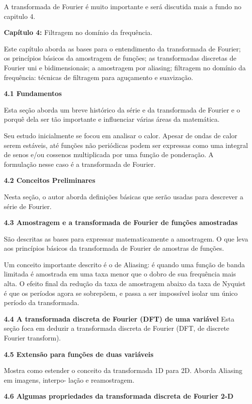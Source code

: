 \documentclass[a4paper]{sbgames}               %
\begin{document}
A transformada de Fourier é muito importante e será discutida mais a fundo no capitulo 4.

\pagebreak
\twocolumn
\textbf{Capítulo 4: } Filtragem no domínio da frequência.

Este capítulo aborda as bases para o entendimento da transformada de Fourier; os princípios básicos da amostragem de funções; as transformadas discretas de Fourier uni e bidimensionais; a amostragem por aliasing; filtragem no domínio da
frequência: técnicas de filtragem para aguçamento e suavização.

\textbf{4.1 Fundamentos}

Esta seção aborda um breve histórico da série e da transformada de Fourier e o porquê dela ser tão importante e influenciar várias áreas da matemática. 

Seu estudo inicialmente se focou em analisar o calor. Apesar de ondas de calor serem estáveis, até funções não periódicas podem ser expressas como uma integral de senos e/ou cossenos multiplicada por uma função de ponderação. A formulação nesse caso é a transformada de Fourier.

\textbf{4.2 Conceitos Preliminares}

Nesta seção, o autor aborda definições básicas que serão usadas para descrever a série de Fourier.

\textbf{4.3 Amostragem e a transformada de Fourier de funções amostradas}

São descritas as bases para expressar matematicamente a amostragem. O que leva aos princípios básicos da transformada de Fourier de amostras de funções. 

Um conceito importante descrito é o de Aliasing: é quando uma função de banda limitada é amostrada em uma taxa menor que o dobro de sua frequência mais alta. O efeito final da redução da taxa de amostragem abaixo da taxa de Nyquist é que os períodos agora se sobrepõem, e passa a ser impossível isolar um único período da transformada.

\textbf{4.4 A transformada discreta de Fourier (DFT) de uma variável}
Esta seção foca em deduzir a transformada discreta de Fourier (DFT, de discrete Fourier transform).

\textbf{4.5 Extensão para funções de duas variáveis}

Mostra como estender o conceito da transformada 1D para 2D. Aborda Aliasing em imagens, interpo- lação e reamostragem.

\textbf{4.6 Algumas propriedades da transformada discreta de Fourier 2-D}
\end{document}
